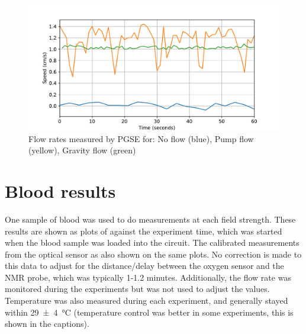 \begin{figure}[ht]
\centering
\includegraphics[width=\textwidth]{figures/contflow/flowstabilityspeed.pdf}
\caption[Flow rate stability for different continuous flow setups]{Flow rates measured by PGSE for: No flow (blue), Pump flow (yellow), Gravity flow (green)}
\label{fig:contflow-flowstabilityspeed}
\end{figure}

\section{Blood results}

One sample of blood was used to do measurements at each field strength.
These results are shown as plots of \Ttwo against the experiment time, which was started when the blood sample was loaded into the circuit.
The calibrated \SOtwo measurements from the optical sensor as also shown on the same plots.
No correction is made to this data to adjust for the distance/delay between the oxygen sensor and the NMR probe, which was typically 1-1.2 minutes.
Additionally, the flow rate was monitored during the experiments but was not used to adjust the \Ttwo values.
Temperature was also measured during each experiment, and generally stayed within \SI{29\pm4}{\celsius} (temperature control was better in some experiments, this is shown in the captions).

